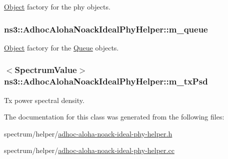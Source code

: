 \hyperlink{classns3_1_1Object}{Object} factory for the phy objects. 

\subsubsection[{\texorpdfstring{m\+\_\+queue}{m_queue}}]{ ns3\+::\+Adhoc\+Aloha\+Noack\+Ideal\+Phy\+Helper\+::m\+\_\+queue\hspace{0.3cm}{\ttfamily [protected]}}\hypertarget{classns3_1_1AdhocAlohaNoackIdealPhyHelper_a1c16959865db59cf9048a872d5b99328}{}\label{classns3_1_1AdhocAlohaNoackIdealPhyHelper_a1c16959865db59cf9048a872d5b99328}


\hyperlink{classns3_1_1Object}{Object} factory for the \hyperlink{classns3_1_1Queue}{Queue} objects. 

\subsubsection[{\texorpdfstring{m\+\_\+tx\+Psd}{m_txPsd}}]{$<${\bf Spectrum\+Value}$>$ ns3\+::\+Adhoc\+Aloha\+Noack\+Ideal\+Phy\+Helper\+::m\+\_\+tx\+Psd\hspace{0.3cm}{\ttfamily [protected]}}\hypertarget{classns3_1_1AdhocAlohaNoackIdealPhyHelper_a684be03c1600fd53054a8654aa3c516b}{}\label{classns3_1_1AdhocAlohaNoackIdealPhyHelper_a684be03c1600fd53054a8654aa3c516b}


Tx power spectral density. 



The documentation for this class was generated from the following files\+:\begin{DoxyCompactItemize}
\item 
spectrum/helper/\hyperlink{adhoc-aloha-noack-ideal-phy-helper_8h}{adhoc-\/aloha-\/noack-\/ideal-\/phy-\/helper.\+h}\item 
spectrum/helper/\hyperlink{adhoc-aloha-noack-ideal-phy-helper_8cc}{adhoc-\/aloha-\/noack-\/ideal-\/phy-\/helper.\+cc}\end{DoxyCompactItemize}

